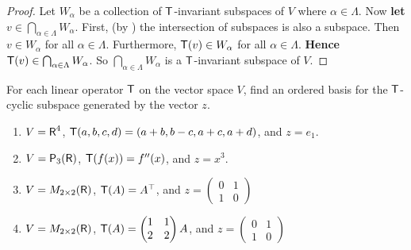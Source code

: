\begin{proof}
Let \(W_{\alpha}\) be a collection of \(\textsf{T}\)-invariant subspaces of \(V\) where \(\alpha \in \Lambda\).
Now \textbf{let} \(v \in \bigcap_{\alpha \in \Lambda} W_{\alpha}\).
First, (by ) the intersection of subspaces is also a subspace.
Then \(v \in W_{\alpha}\) for all \(\alpha \in \Lambda\).
Furthermore, \(\textsf{T}(v) \in W_{\alpha}\) for all \(\alpha \in \Lambda\).
\textbf{Hence} \(\textsf{T}(v) \in \bigcap_{\alpha \in \Lambda} W_{\alpha}\).
So \(\bigcap_{\alpha \in \Lambda} W_{\alpha}\) is a \(\textsf{T}\)-invariant subspace of \(V\).
\end{proof}

\begin{exercise} \label{exercise 5.4.6}
For each linear operator \(\textsf{T}\) on the vector space \(V\), find an ordered basis for the \(\textsf{T}\)-cyclic subspace generated by the vector \(z\).
\begin{enumerate}
\item \(V = \textsf{R}^4\), \(\textsf{T}(a, b, c, d) = (a + b, b - c, a + c, a + d)\), and \(z = e_1\).
\item \(V = \textsf{P}_3(\textsf{R})\), \(\textsf{T}(f(x)) = f''(x)\), and \(z = x^3\).
\item \(V = M_{2 \times 2}(\textsf{R})\), \(\textsf{T}(A) = A^\top\), and \(z = \begin{pmatrix} 0 & 1 \\ 1 & 0 \end{pmatrix}\)
\item \(V = M_{2 \times 2}(\textsf{R})\), \(\textsf{T}(A) = \begin{pmatrix} 1 & 1 \\ 2 & 2 \end{pmatrix} A\), and \(z = \begin{pmatrix} 0 & 1 \\ 1 & 0 \end{pmatrix}\)
\end{enumerate}
\end{exercise}

